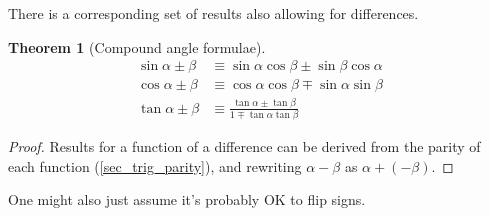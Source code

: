 \documentclass[fleqn,a4paper,11pt]{article}
\newtheorem{theorem}{Theorem}[section]
\begin{document}
    There is a corresponding set of results also allowing for differences.
    \begin{theorem}[Compound angle formulae] \label{thm_trig_compound}
    \begin{align*}
    \sin \alpha \pm \beta &\equiv
       \sin \alpha \cos \beta \pm \sin \beta \cos \alpha \\
    \cos \alpha \pm \beta &\equiv
       \cos \alpha \cos \beta \mp \sin \alpha \sin \beta \\
    \tan \alpha \pm \beta &\equiv
        \frac{\tan \alpha \pm \tan \beta}{1 \mp \tan \alpha \tan \beta}
    \end{align*}
    \end{theorem}
    \begin{proof}
    Results for a function of a difference can be derived from the parity of
    each function (\ref{sec_trig_parity}), and rewriting \(\alpha - \beta\) as
    \(\alpha + (-\beta)\).
    \end{proof}
    One might also just assume it's probably OK to flip signs.
\end{document}
